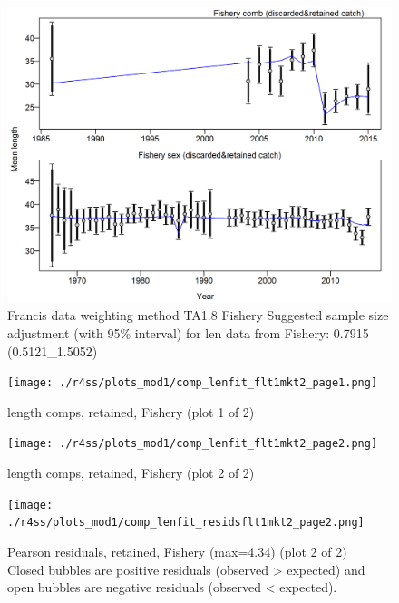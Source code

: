 \documentclass[12pt,]{article}
\begin{document}
\begin{figure}
\centering
\includegraphics{./r4ss/plots_mod1/comp_lenfit_data_weighting_TA1.8_Fishery.png}
\caption{Francis data weighting method TA1.8 Fishery Suggested sample
size adjustment (with 95\% interval) for len data from Fishery: 0.7915
(0.5121\_1.5052)
\label{fig:mod1_4_comp_lenfit_data_weighting_TA1.8_Fishery}}
\end{figure}

\begin{figure}
\centering
\texttt{[image: ./r4ss/plots\_mod1/comp\_lenfit\_flt1mkt2\_page1.png]}
\caption{length comps, retained, Fishery (plot 1 of 2)
\label{fig:mod1_5_comp_lenfit_flt1mkt2_page1}}
\end{figure}

\begin{figure}
\centering
\texttt{[image: ./r4ss/plots\_mod1/comp\_lenfit\_flt1mkt2\_page2.png]}
\caption{length comps, retained, Fishery (plot 2 of 2)
\label{fig:mod1_6_comp_lenfit_flt1mkt2_page2}}
\end{figure}

\begin{figure}
\centering
\texttt{[image: ./r4ss/plots\_mod1/comp\_lenfit\_residsflt1mkt2\_page2.png]}
\caption{Pearson residuals, retained, Fishery (max=4.34) (plot 2 of 2)\\
Closed bubbles are positive residuals (observed \textgreater{} expected)
and open bubbles are negative residuals (observed \textless{} expected).
\label{fig:mod1_7_comp_lenfit_residsflt1mkt2_page2}}
\end{figure}
\end{document}
